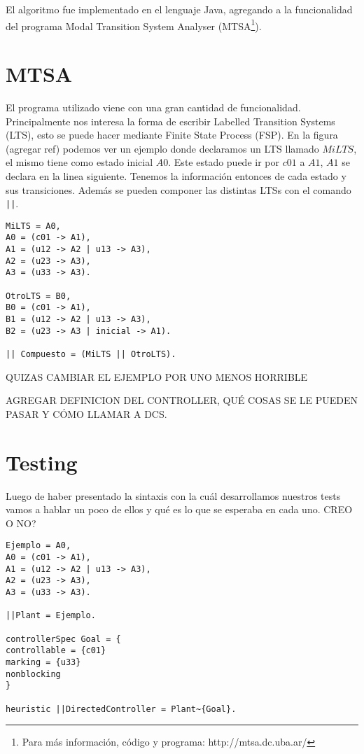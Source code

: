 
El algoritmo fue implementado en el lenguaje Java, agregando a la funcionalidad del programa Modal Transition System Analyser (MTSA\footnote{Para más información, código y programa: http://mtsa.dc.uba.ar/}).

\section{MTSA}
El programa utilizado viene con una gran cantidad de funcionalidad. Principalmente nos interesa la forma de escribir Labelled Transition Systems (LTS), esto se puede hacer mediante Finite State Process (FSP). En la figura (agregar ref) podemos ver un ejemplo donde declaramos un LTS llamado $MiLTS$, el mismo tiene como estado inicial $A0$. Este estado puede ir por $c01$ a $A1$, $A1$ se declara en la linea siguiente. Tenemos la información entonces de cada estado y sus transiciones. Además se pueden componer las distintas LTSs con el comando \texttt{||}.

\begin{lstlisting}[language = mtsa, caption=Ejemplo de LTS y composición]
MiLTS = A0,
A0 = (c01 -> A1),
A1 = (u12 -> A2 | u13 -> A3),
A2 = (u23 -> A3),
A3 = (u33 -> A3).

OtroLTS = B0,
B0 = (c01 -> A1),
B1 = (u12 -> A2 | u13 -> A3),
B2 = (u23 -> A3 | inicial -> A1).

|| Compuesto = (MiLTS || OtroLTS).
\end{lstlisting}
QUIZAS CAMBIAR EL EJEMPLO POR UNO MENOS HORRIBLE

AGREGAR DEFINICION DEL CONTROLLER, QUÉ COSAS SE LE PUEDEN PASAR Y CÓMO LLAMAR A DCS.

\section{Testing}
Luego de haber presentado la sintaxis con la cuál desarrollamos nuestros tests vamos a hablar un poco de ellos y qué es lo que se esperaba en cada uno. CREO O NO?

\begin{lstlisting}[language = mtsa, caption=Ejemplo de test]
Ejemplo = A0,
A0 = (c01 -> A1),
A1 = (u12 -> A2 | u13 -> A3),
A2 = (u23 -> A3),
A3 = (u33 -> A3).

||Plant = Ejemplo.

controllerSpec Goal = {
controllable = {c01}
marking = {u33}
nonblocking
}

heuristic ||DirectedController = Plant~{Goal}.
\end{lstlisting}
